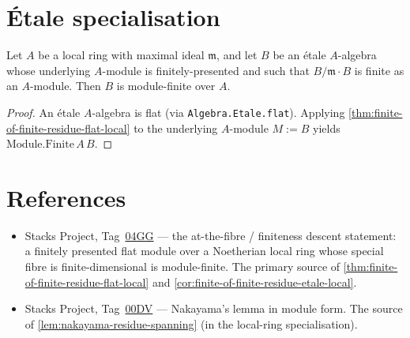 \section{Étale specialisation}

\begin{corollary}
  \label{cor:finite-of-finite-residue-etale-local}
  Let \(A\) be a local ring with maximal ideal \(\mathfrak{m}\),
  and let \(B\) be an étale \(A\)-algebra whose underlying
  \(A\)-module is finitely-presented and such that
  \(B / \mathfrak{m} \cdot B\) is finite as an \(A\)-module. Then
  \(B\) is module-finite over \(A\).
\end{corollary}

\begin{proof}
  \leanok
  An étale \(A\)-algebra is flat (via
  \texttt{Algebra.Etale.flat}). Applying
  \cref{thm:finite-of-finite-residue-flat-local} to the underlying
  \(A\)-module \(M := B\) yields \(\mathrm{Module.Finite}\,A\,B\).
\end{proof}

\section{References}

\begin{itemize}
\item Stacks Project, Tag~\href{https://stacks.math.columbia.edu/tag/04GG}{04GG} —
  the at-the-fibre / finiteness descent statement: a finitely
  presented flat module over a Noetherian local ring whose special
  fibre is finite-dimensional is module-finite. The primary source
  of \cref{thm:finite-of-finite-residue-flat-local} and
  \cref{cor:finite-of-finite-residue-etale-local}.
\item Stacks Project, Tag~\href{https://stacks.math.columbia.edu/tag/00DV}{00DV} —
  Nakayama's lemma in module form. The source of
  \cref{lem:nakayama-residue-spanning} (in the local-ring
  specialisation).
\end{itemize}
